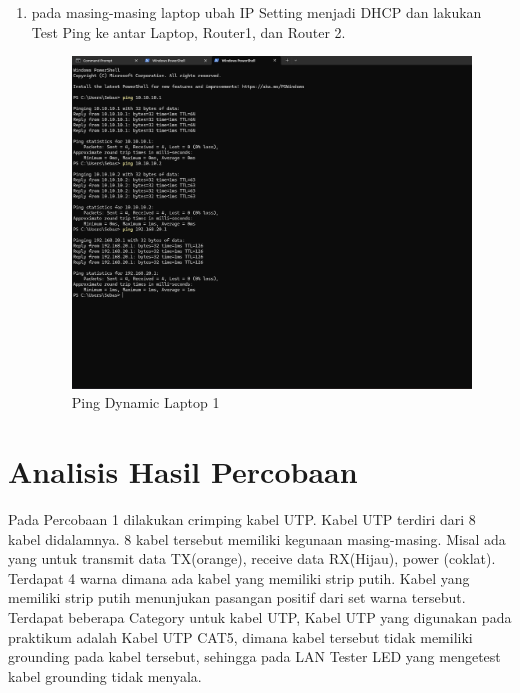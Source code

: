 \begin{enumerate}
    \item pada masing-masing laptop ubah IP Setting menjadi DHCP dan lakukan Test Ping ke antar Laptop, Router1, dan Router 2.
    \begin{figure}[H]
        \centering
        \includegraphics[width=0.5\linewidth]{P1/img/ping dynamic.png}
        \caption{Ping Dynamic Laptop 1}
        \label{fig:enter-label}
    \end{figure}
    
\end{enumerate}

\section{Analisis Hasil Percobaan}
Pada Percobaan 1 dilakukan crimping kabel UTP. Kabel UTP terdiri dari 8 kabel didalamnya. 8 kabel tersebut memiliki kegunaan masing-masing. Misal ada yang untuk transmit data TX(orange), receive data RX(Hijau), power (coklat). Terdapat 4 warna dimana ada kabel yang memiliki strip putih. Kabel yang memiliki strip putih menunjukan pasangan positif dari set warna tersebut. Terdapat beberapa Category untuk kabel UTP, Kabel UTP yang digunakan pada praktikum adalah Kabel UTP CAT5, dimana kabel tersebut tidak memiliki grounding pada kabel tersebut, sehingga pada LAN Tester LED yang mengetest kabel grounding tidak menyala.

